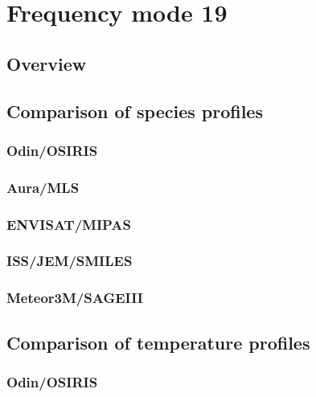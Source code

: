 \section{Frequency mode 19}
\label{sec:fm19}

\subsection{Overview}
\label{sec:fm19:overview}

\subsection{Comparison of species profiles}
\label{sec:fm19:comparison:species}

\subsubsection{Odin/OSIRIS}
\label{sec:fm19:comparison:species:osiris}

\subsubsection{Aura/MLS}
\label{sec:fm19:comparison:species:mls}

\subsubsection{ENVISAT/MIPAS}
\label{sec:fm19:comparison:species:mipas}

\subsubsection{ISS/JEM/SMILES}
\label{sec:fm19:comparison:species:smiles}

\subsubsection{Meteor3M/SAGEIII}
\label{sec:fm19:comparison:species:sage3}


\subsection{Comparison of temperature profiles}
\label{sec:fm19:comparison:temperature}

\subsubsection{Odin/OSIRIS}
\label{sec:fm19:comparison:temperature:osiris}

